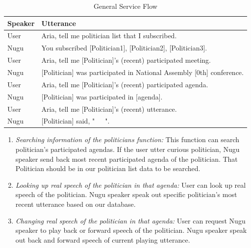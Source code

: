 \documentclass[conference]{IEEEtran}
\begin{document}
\begin{enumerate}
        
\begin{table}[htbp]
  \renewcommand{\arraystretch}{1.5}
\caption{General Service Flow}
\begin{center}
\begin{tabular}{|p{1cm}|p{8cm}|}
\hline
\textbf{Speaker} & \textbf{Utterance}\\
\hline
User & Aria, tell me politician list that I subscribed. \\
\hline
Nugu & You subscribed [Politician1], [Politician2], [Politician3]. \\
\hline
User & Aria, tell me [Politician]'s (recent) participated meeting.\\
\hline
Nugu & [Politician] was participated in National Assembly [0th] conference.\\
\hline
User & Aria, tell me [Politician]'s (recent) participated agenda. \\
\hline
Nugu & [Politician] was participated in [agenda].\\
\hline
User & Aria, tell me [Politician]'s (recent) utterance.\\
\hline
Nugu & [Politician] said, "~~~".\\
\hline
\end{tabular}
\label{tab2}
\end{center}
\end{table}


        
        \begin{enumerate}
        \item \textit{Searching information of the politicians function:} This function can search politician’s participated agendas. If the user utter curious politician, Nugu speaker send back most recent participated agenda of the politician. That Politician should be in our politician list data to be searched.\\
        
 
        \item \textit{Looking up real speech of the politician in that agenda:} User can look up real speech of the politician. Nugu speaker speak out specific politician’s most recent utterance based on our database.\\
        
        \item \textit{Changing real speech of the politician in that agenda:} User can request Nugu speaker to play back or forward speech of the politician. Nugu speaker speak out back and forward speech of current playing utterance.\\
        

\end{enumerate}
\end{enumerate}
\end{document}
